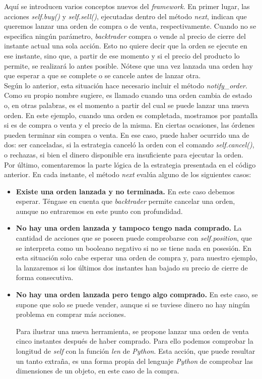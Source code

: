 		Aqu\'i se introducen varios conceptos nuevos del \textit{framework}. En primer lugar, las acciones \textit{self.buy()} y \textit{self.sell()}, ejecutadas dentro del m\'etodo \textit{next}, indican que queremos lanzar una orden de compra o de venta, respectivamente. Cuando no se especifica ning\'un par\'ametro, \textit{backtrader} compra o vende al precio de cierre del instante actual una sola acci\'on. Esto no quiere decir que la orden se ejecute en ese instante, sino que, a partir de ese momento y si el precio del producto lo permite, se realizar\'a lo antes posible. N\'otese que una vez lanzada una orden hay que esperar a que se complete o se cancele antes de lanzar otra.\\
		
		Seg\'un lo anterior, esta situaci\'on hace necesario incluir el m\'etodo \textit{notify\_order}. Como su propio nombre sugiere, es llamado cuando una orden cambia de estado o, en otras palabras, es el momento a partir del cual se puede lanzar una nueva orden. En este ejemplo, cuando una orden es completada, mostramos por pantalla si es de compra o venta y el precio de la misma. En ciertas ocasiones, las \'ordenes pueden terminar sin compra o venta. En ese caso, puede haber ocurrido una de dos: ser canceladas, si la estrategia cancel\'o la orden con el comando \textit{self.cancel()}, o rechazas, si bien el dinero disponible era insuficiente para ejecutar la orden.\\
		
		Por \'ultimo, comentaremos la parte l\'ogica de la estrategia presentada en el c\'odigo anterior. En cada instante, el m\'etodo \textit{next} eval\'ua alguno de los siguientes casos:\\
		
		\begin{itemize}
			\item \textbf{Existe una orden lanzada y no terminada.} En este caso debemos esperar. T\'engase en cuenta que \textit{backtrader} permite cancelar una orden, aunque no entraremos en este punto con profundidad.
			\item \textbf{No hay una orden lanzada y tampoco tengo nada comprado.} La cantidad de acciones que se poseen puede comprobarse con \textit{self.position}, que se interpreta como un booleano negativo si no se tiene nada en posesi\'on. En esta situaci\'on solo cabe esperar una orden de compra y, para nuestro ejemplo, la lanzaremos si los \'ultimos dos instantes han bajado su precio de cierre de forma consecutiva.
			\item \textbf{No hay una orden lanzada pero tengo algo comprado.} En este caso, se supone que solo se puede vender, aunque si se tuviese dinero no hay ning\'un problema en comprar m\'as acciones.
			
			 Para ilustrar una nueva herramienta, se propone lanzar una orden de venta cinco instantes despu\'es de haber comprado. Para ello podemos comprobar la longitud de \textit{self} con la funci\'on \textit{len} de \textit{Python}. Esta acci\'on, que puede resultar un tanto extra\~na, es una forma propia del lenguaje \textit{Python} de comprobar las dimensiones de un objeto, en este caso de la compra.
		\end{itemize}
		
